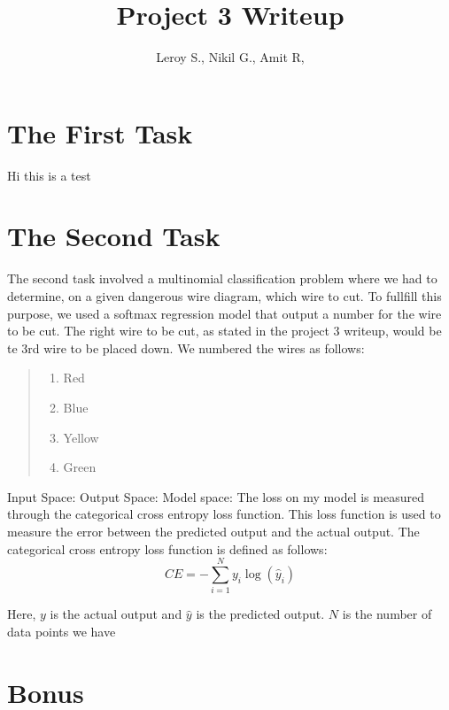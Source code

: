 \documentclass{article}
\title{Project 3 Writeup}
\author{Leroy S., Nikil G., Amit R,}
\begin{document}
\maketitle

\section*{The First Task}
Hi this is a test

\section*{The Second Task}
The second task involved a multinomial classification problem where we had to determine, on a given dangerous wire diagram, which wire to cut.
To fullfill this purpose, we used a softmax regression model that output a number for the wire to be cut. The right wire to be cut, as stated in the project 3 writeup, would be te 3rd wire to be placed down.\newline
\newline
We numbered the wires as follows:
\begin{quote}
    \begin{enumerate}
    \item Red
    \item Blue
    \item Yellow
    \item Green
    \end{enumerate}
\end{quote}

\noindent Input Space:\newline
Output Space:\newline
Model space:\newline
\newline The loss on my model is measured through the categorical cross entropy loss function. 
This loss function is used to measure the error between the predicted output and the actual output. The categorical cross entropy loss function is defined as follows:
\begin{equation}
    CE = -\sum_{i=1}^{N} y_{i} \log(\hat{y}_{i})
\end{equation}

\noindent Here, $y$ is the actual output and $\hat{y}$ is the predicted output. $N$ is the number of data points we have
\section*{Bonus}
\end{document}
